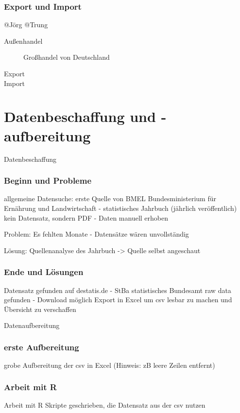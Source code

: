 \documentclass{beamer}
\begin{document}
\begin{frame}
\frametitle{Export und Import}
	@Jörg @Trung
	\begin{description}
		\item[Außenhandel] Großhandel von Deutschland
		\item[Export]
		\item[Import]
	\end{description}
\end{frame}

\section{Datenbeschaffung und -aufbereitung}
\begin{frame}
	\begin{center}
		{\Huge Datenbeschaffung}
	\end{center}
\end{frame}

\begin{frame}
	\frametitle{Beginn und Probleme}
	allgemeine Datensuche: erste Quelle von 
	BMEL Bundesministerium für Ernährung und Landwirtschaft - statistisches Jahrbuch (jährlich veröffentlich)
	kein Datensatz, sondern PDF - Daten manuell erhoben

	Problem: Es fehlten Monate - Datensätze wären unvollständig

	Lösung: Quellenanalyse des Jahrbuch -> Quelle selbst angeschaut 

\end{frame}

\begin{frame}
	\frametitle{Ende und Lösungen}
	Datensatz gefunden auf destatis.de - StBa statistisches Bundesamt 
	raw data gefunden - Download möglich
	Export in Excel um csv lesbar zu machen und Übersicht zu verschaffen
\end{frame}

\begin{frame}
	\begin{center}
		{\Huge Datenaufbereitung}
	\end{center}
\end{frame}

\begin{frame}
	\frametitle{erste Aufbereitung}
	grobe Aufbereitung der csv in Excel (Hinweis: zB leere Zeilen entfernt)
\end{frame}
\begin{frame}
	\frametitle{Arbeit mit R}
	Arbeit mit R
	Skripte geschrieben, die Datensatz aus der csv nutzen
\end{frame}
\end{document}
